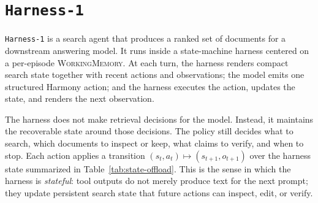 \documentclass{article}
\newcommand{\sys}{\texttt{Harness-1}\xspace}
\newcommand{\wm}{\textsc{WorkingMemory}\xspace}
\begin{document}


\section{\sys}
\label{sec:method}

\sys is a search agent that produces a ranked set of documents for a downstream
answering model. It runs inside a state-machine harness centered on a
per-episode \wm. At each turn, the harness renders compact search state together
with recent actions and observations; the model emits one structured Harmony
action; and the harness executes the action, updates the state, and renders the
next observation.

The harness does not make retrieval decisions for the model. Instead, it
maintains the recoverable state around those decisions. The policy still decides
what to search, which documents to inspect or keep, what claims to verify, and
when to stop. Each action applies a transition
$(s_t,a_t)\mapsto(s_{t+1},o_{t+1})$ over the harness state summarized in
Table~\ref{tab:state-offload}. This is the sense in which the harness is
\emph{stateful}: tool outputs do not merely produce text for the next prompt;
they update persistent search state that future actions can inspect, edit, or
verify.
\end{document}
